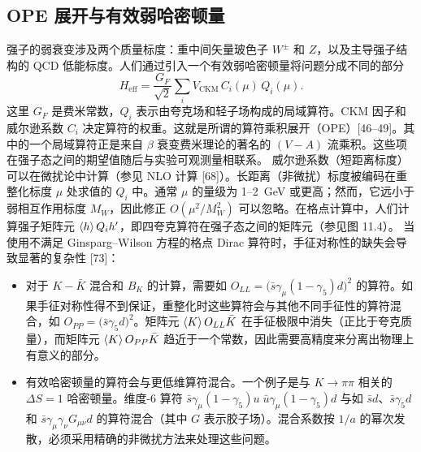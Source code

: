 \subsection{OPE 展开与有效弱哈密顿量}
\label{sec:weak}
强子的弱衰变涉及两个质量标度：重中间矢量玻色子 $W^\pm$ 和 $Z$，以及主导强子结构的 QCD 低能标度。人们通过引入一个有效弱哈密顿量将问题分成不同的部分
\begin{equation}
H_{\mathrm{eff}} = \frac{G_F}{\sqrt{2}} \sum_i V_{\mathrm{CKM}}\, C_i(\mu)\, Q_i(\mu) .
\end{equation}
这里 $G_F$ 是费米常数，$Q_i$ 表示由夸克场和轻子场构成的局域算符。CKM 因子和威尔逊系数 $C_i$ 决定算符的权重。这就是所谓的算符乘积展开（OPE）[46--49]。其中的一个局域算符正是来自 $\beta$ 衰变费米理论的著名的 $(V - A)$ 流乘积。这些项在强子态之间的期望值随后与实验可观测量相联系。
威尔逊系数（短距离标度）可以在微扰论中计算（参见 NLO 计算 [68]）。长距离（非微扰）标度被编码在重整化标度 $\mu$ 处求值的 $Q_i$ 中。通常 $\mu$ 的量级为 1--2~GeV 或更高；然而，它远小于弱相互作用标度 $M_W$，因此修正 $O(\mu^2/M_W^2)$ 可以忽略。在格点计算中，人们计算强子矩阵元 $\left\langle h \right\rangle{Q_i}{h'}$，即四夸克算符在强子态之间的矩阵元（参见图 11.4）。
当使用不满足 Ginsparg–Wilson 方程的格点 Dirac 算符时，手征对称性的缺失会导致显著的复杂性 [73]：
\begin{itemize}
\item 对于 $K - \bar{K}$ 混合和 $B_K$ 的计算，需要如 $O_{LL} = \bigl(\bar{s}\gamma_\mu(1 - \gamma_5)d\bigr)^2$ 的算符。如果手征对称性得不到保证，重整化时这些算符会与其他不同手征性的算符混合，如 $O_{PP} = \bigl(\bar{s}\gamma_5 d\bigr)^2$。矩阵元 $\left\langle K \right\rangle{O_{LL}}{\bar{K}}$ 在手征极限中消失（正比于夸克质量），而矩阵元 $\left\langle K \right\rangle{O_{PP}}{\bar{K}}$ 趋近于一个常数，因此需要高精度来分离出物理上有意义的部分。
\item 有效哈密顿量的算符会与更低维算符混合。一个例子是与 $K \to \pi\pi$ 相关的 $\Delta S = 1$ 哈密顿量。维度-6 算符 $\bar{s}\gamma_\mu(1 - \gamma_5)u\;\bar{u}\gamma_\mu(1 - \gamma_5)d$ 与如 $\bar{s}d$、$\bar{s}\gamma_5 d$ 和 $\bar{s}\gamma_\mu\gamma_\nu G_{\mu\nu} d$ 的算符混合（其中 $G$ 表示胶子场）。混合系数按 $1/a$ 的幂次发散，必须采用精确的非微扰方法来处理这些问题。
\end{itemize}


